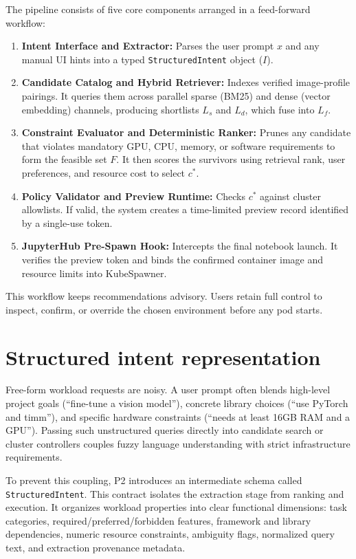 The pipeline consists of five core components arranged in a feed-forward workflow:
\begin{enumerate}
    \item \textbf{Intent Interface and Extractor:} Parses the user prompt $x$ and any manual UI hints into a typed \texttt{StructuredIntent} object ($I$).
    \item \textbf{Candidate Catalog and Hybrid Retriever:} Indexes verified image-profile pairings. It queries them across parallel sparse (BM25) and dense (vector embedding) channels, producing shortlists $L_s$ and $L_d$, which fuse into $L_f$.
    \item \textbf{Constraint Evaluator and Deterministic Ranker:} Prunes any candidate that violates mandatory GPU, CPU, memory, or software requirements to form the feasible set $F$. It then scores the survivors using retrieval rank, user preferences, and resource cost to select $c^*$.
    \item \textbf{Policy Validator and Preview Runtime:} Checks $c^*$ against cluster allowlists. If valid, the system creates a time-limited preview record identified by a single-use token.
    \item \textbf{JupyterHub Pre-Spawn Hook:} Intercepts the final notebook launch. It verifies the preview token and binds the confirmed container image and resource limits into KubeSpawner.
\end{enumerate}
This workflow keeps recommendations advisory. Users retain full control to inspect, confirm, or override the chosen environment before any pod starts.

\section{Structured intent representation}

Free-form workload requests are noisy. A user prompt often blends high-level project goals (``fine-tune a vision model''), concrete library choices (``use PyTorch and timm''), and specific hardware constraints (``needs at least 16GB RAM and a GPU''). Passing such unstructured queries directly into candidate search or cluster controllers couples fuzzy language understanding with strict infrastructure requirements.

To prevent this coupling, P2 introduces an intermediate schema called \texttt{StructuredIntent}. This contract isolates the extraction stage from ranking and execution. It organizes workload properties into clear functional dimensions: task categories, required/preferred/forbidden features, framework and library dependencies, numeric resource constraints, ambiguity flags, normalized query text, and extraction provenance metadata.

